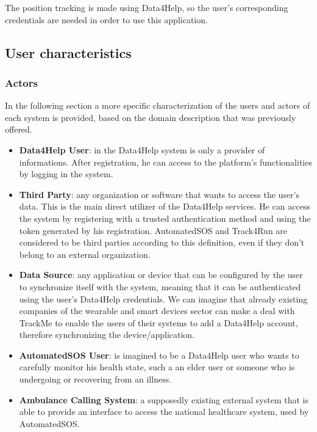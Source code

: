 The position tracking is made using Data4Help, so the user's corresponding credentials are needed in order to use this application.

\subsection{User characteristics}

\subsubsection{Actors}
In the following section a more specific characterization of the users and actors of each system is provided, based on the domain description that was previously offered.

\begin{itemize}
\item \textbf{Data4Help User}: in the Data4Help system is only a provider of informations. After registration, he can access to the platform's functionalities by logging in the system.
 
\item \textbf{Third Party}: any organization or software that wants to access the user's data. This is the main direct utilizer of the Data4Help services. He can access the system by registering with a trusted authentication method and using the token generated by his registration. 
AutomatedSOS and Track4Run are considered to be third parties according to this definition, even if they don't belong to an external organization.

\item \textbf{Data Source}: any application or device that can be configured by the user to synchronize itself with the system, meaning that it can be authenticated using the user's Data4Help credentials.
We can imagine that already existing companies of the wearable and smart devices sector can make a deal with TrackMe to enable the users of their systems to add a Data4Help account, therefore synchronizing the device/application. 

\item \textbf{AutomatedSOS User}: is imagined to be a Data4Help user who wants to carefully monitor his health state, such a an elder user or someone who is undergoing or recovering from an illness.

\item \textbf{Ambulance Calling System}: a supposedly existing external system that is able to provide an interface to access the national healthcare system, used by AutomatedSOS.


\end{itemize}
